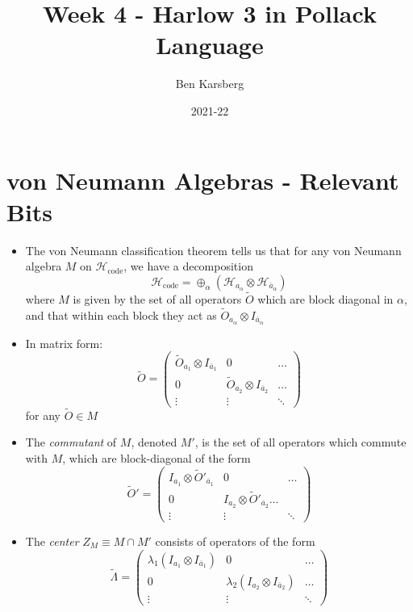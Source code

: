 \documentclass[12pt,a4paper]{article}
\title{Week 4 - Harlow 3 in Pollack Language}
\author{Ben Karsberg}
\date{2021-22}
\numberwithin{equation}{section}
\newcommand{\Hcode}{\mathcal{H}_{\text{code}}}
\newcommand{\ol}[1]{\overline{#1}}
\theoremstyle{definition}
\theoremstyle{theorem}
\theoremstyle{example}
\begin{document}
	\maketitle
	\section{von Neumann Algebras - Relevant Bits}
	\begin{itemize}
		\item The von Neumann classification theorem tells us that for any von Neumann algebra $M$ on $\Hcode$, we have a decomposition
		\begin{equation}
			\Hcode=\oplus_{\alpha}(\mathcal{H}_{a_{\alpha}}\otimes\mathcal{H}_{\overline{a}_{\alpha}})
		\end{equation}
		where $M$ is given by the set of all operators $\tilde{O}$ which are block diagonal in $\alpha$, and that within each block they act as $\tilde{O}_{a_{\alpha}}\otimes I_{\overline{a}_{\alpha}}$
		\item In matrix form:
		\begin{equation}
			\tilde{O}=\begin{pmatrix}
				\tilde{O}_{a_{1}}\otimes I_{\overline{a}_{1}}&0&\dots\\0&\tilde{O}_{a_{2}}\otimes I_{\ol{a}_{2}}&\dots\\\vdots&\vdots&\ddots
			\end{pmatrix}
		\end{equation}
		for any $\tilde{O}\in M$
		\item The \textit{commutant} of $M$, denoted $M'$, is the set of all operators which commute with $M$, which are block-diagonal of the form
		\begin{equation}
			\tilde{O}'=\begin{pmatrix}
				I_{a_{1}}\otimes\tilde{O}'_{\ol{a}_{1}}&0&\dots\\0&I_{a_{2}}\otimes\tilde{O}'_{\ol{a}_{2}}\dots\\\vdots&\vdots&\ddots
			\end{pmatrix}
		\end{equation}
		\item The \textit{center} $Z_{M}\equiv M\cap M'$ consists of operators of the form
		\begin{equation}
			\tilde{\Lambda}=\begin{pmatrix}\lambda_{1}(I_{a_{1}}\otimes I_{\ol{a}_{1}})&0&\dots\\0&\lambda_{2}(I_{a_{2}}\otimes I_{\ol{a}_{2}})&\dots\\\vdots&\vdots&\ddots\end{pmatrix}

\end{equation}
\end{itemize}
\end{document}

